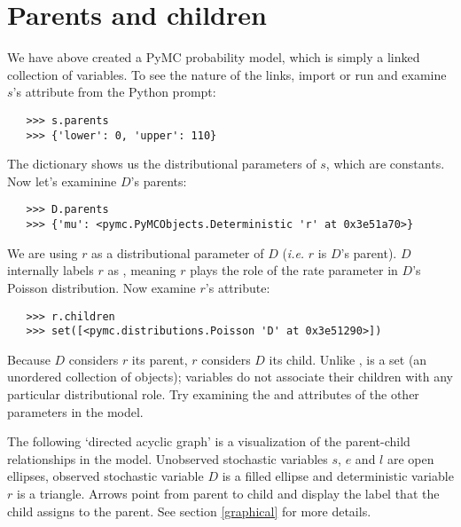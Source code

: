 \section{Parents and children}

We have above created a PyMC probability model, which is simply a linked collection of variables. To see the nature of the links, import or run  and examine $s$'s  attribute from the Python prompt:
\begin{verbatim}
   >>> s.parents
   >>> {'lower': 0, 'upper': 110}
\end{verbatim}
The  dictionary shows us the distributional parameters of $s$, which are constants. Now let's examinine $D$'s parents:
\begin{verbatim}
   >>> D.parents
   >>> {'mu': <pymc.PyMCObjects.Deterministic 'r' at 0x3e51a70>}
\end{verbatim}
We are using $r$ as a distributional parameter of $D$ (\emph{i.e.} $r$ is $D$'s parent). $D$ internally labels $r$ as , meaning $r$ plays the role of the rate parameter in $D$'s Poisson distribution. Now examine $r$'s  attribute:
\begin{verbatim}
   >>> r.children
   >>> set([<pymc.distributions.Poisson 'D' at 0x3e51290>])
\end{verbatim}
Because $D$ considers $r$ its parent, $r$ considers $D$ its child. Unlike ,  is a set (an unordered collection of objects); variables do not associate their children with any particular distributional role. Try examining the  and  attributes of the other parameters in the model.

The following `directed acyclic graph' is a visualization of the parent-child relationships in the model. Unobserved stochastic variables $s$, $e$ and $l$ are open ellipses, observed stochastic variable $D$ is a filled ellipse and deterministic variable $r$ is a triangle. Arrows point from parent to child and display the label that the child assigns to the parent. See section \ref{graphical} for more details.
\begin{center}
\end{center}

